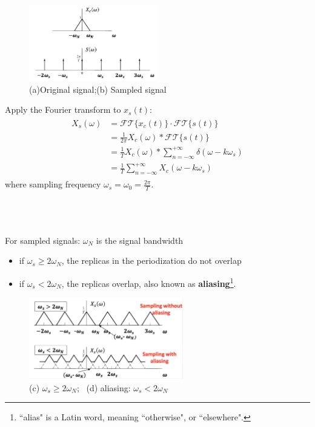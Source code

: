 \begin{minipage}{\textwidth}
\begin{figure}
\includegraphics[width = 0.5\textwidth]{images/sampling1}
\caption{(a)Original signal;(b) Sampled signal } \end{figure}
Apply the Fourier transform to  $x_{s}(t)$:
\begin{align*} \begin{split}
X_{s}(\omega) &= \mathcal{FT}\{x_{c}(t)\} \cdot \mathcal{FT}\{s(t)\}\\
&=\frac{1}{2\pi} X_{c}(\omega) * \mathcal{FT}\{s(t)\} \\
&=\frac{1}{T} X_{c}(\omega) * \sum_{n=-\infty}^{+\infty} \delta (\omega - k \omega_{s})\\
&=\boxed{\frac{1}{T} \sum_{n=-\infty}^{+\infty}  X_{c}(\omega - k \omega_{s})}
\end{split} \end{align*}
where sampling frequency $\omega_{s}=\omega_{0}=\frac{2\pi}{T}$.
\end{minipage}
\ \\\\\\
For sampled signals: $\omega_{N}$ is the signal bandwidth
\begin{itemize}
    \item if $\omega_{s} \geq 2\omega_{N}$, the replicas in the periodization do not overlap
    \item if $\omega_{s} < 2\omega_{N}$, the replicas overlap, also known as \textbf{aliasing}\footnote{``alias" is a Latin word, meaning ``otherwise", or ``elsewhere".}.
\end{itemize} 

\begin{figure}[H]\centering
\includegraphics[width = 0.6\textwidth]{images/sampling2}
\caption{(c) $\omega_{s} \geq 2\omega_{N}$; \ (d) aliasing: $\omega_{s} < 2\omega_{N}$} \end{figure}

